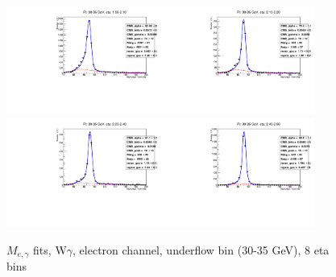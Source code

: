 \begin{figure}[htb]
\begin{center}
   \includegraphics[width=0.45\textwidth]{../figs/figs_v11/ELECTRON_WGamma/EtoGammaFits/sa_hZmass_h_Data_EtoGamma_Enr_ENDCAP_pt30to35_ieta0_noWMtCut.pdf}\includegraphics[width=0.45\textwidth]{../figs/figs_v11/ELECTRON_WGamma/EtoGammaFits/sa_hZmass_h_Data_EtoGamma_Enr_ENDCAP_pt30to35_ieta1_noWMtCut.pdf}\\
   \includegraphics[width=0.45\textwidth]{../figs/figs_v11/ELECTRON_WGamma/EtoGammaFits/sa_hZmass_h_Data_EtoGamma_Enr_ENDCAP_pt30to35_ieta2_noWMtCut.pdf}\includegraphics[width=0.45\textwidth]{../figs/figs_v11/ELECTRON_WGamma/EtoGammaFits/sa_hZmass_h_Data_EtoGamma_Enr_ENDCAP_pt30to35_ieta3_noWMtCut.pdf}\\
  \label{fig:etogFits_30to35}
  \caption{$M_{e,\gamma}$ fits, W$\gamma$, electron channel, underflow bin (30-35 GeV), 8 eta bins}
  \end{center}
\end{figure}

